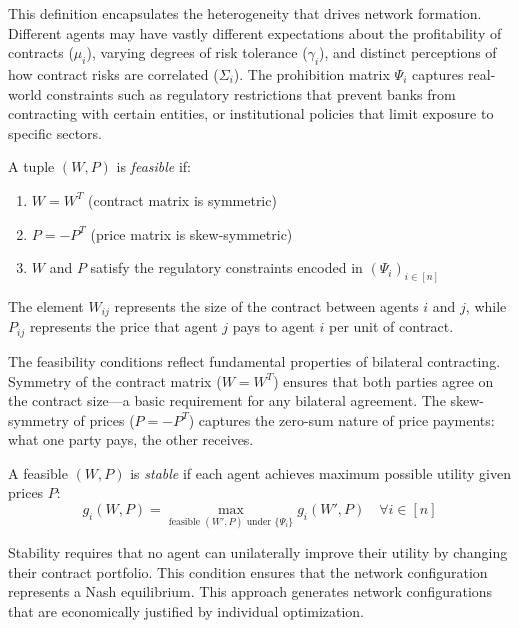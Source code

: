 This definition encapsulates the heterogeneity that drives network formation. Different agents may have vastly different expectations about the profitability of contracts ($\mu_i$), varying degrees of risk tolerance ($\gamma_i$), and distinct perceptions of how contract risks are correlated ($\Sigma_i$). The prohibition matrix $\Psi_i$ captures real-world constraints such as regulatory restrictions that prevent banks from contracting with certain entities, or institutional policies that limit exposure to specific sectors.

\begin{definition}
\label{def:original_feasible}
A tuple $(W, P)$ is \textit{feasible} if:
\begin{enumerate}
   \item $W = W^T$ (contract matrix is symmetric)
   \item $P = -P^T$ (price matrix is skew-symmetric)  
   \item $W$ and $P$ satisfy the regulatory constraints encoded in $(\Psi_i)_{i \in [n]}$
\end{enumerate}

The element $W_{ij}$ represents the size of the contract between agents $i$ and $j$, while $P_{ij}$ represents the price that agent $j$ pays to agent $i$ per unit of contract.
\end{definition}

The feasibility conditions reflect fundamental properties of bilateral contracting. Symmetry of the contract matrix ($W = W^T$) ensures that both parties agree on the contract size—a basic requirement for any bilateral agreement. The skew-symmetry of prices ($P = -P^T$) captures the zero-sum nature of price payments: what one party pays, the other receives. 


\begin{definition}
\label{def:original_stable}
A feasible $(W, P)$ is \textit{stable} if each agent achieves maximum possible utility given prices $P$:
\begin{equation}
g_i(W, P) = \max_{\text{feasible }(W', P)\text{ under }\{\Psi_i\}} g_i(W', P) \quad \forall i \in [n]
\label{eq:original_stable_condition}
\end{equation}
\end{definition}

Stability requires that no agent can unilaterally improve their utility by changing their contract portfolio. This condition ensures that the network configuration represents a Nash equilibrium. This approach generates network configurations that are economically justified by individual optimization.

